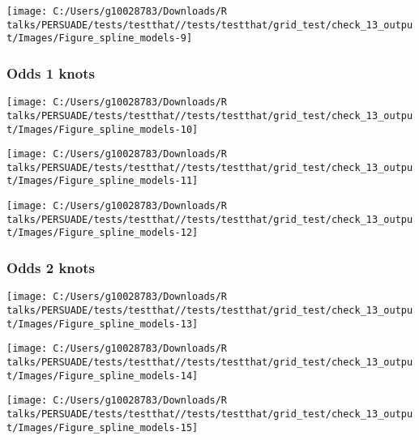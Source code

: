\documentclass[
]{article}
\begin{document}
\begin{flushleft}\texttt{[image: C:/Users/g10028783/Downloads/R talks/PERSUADE/tests/testthat//tests/testthat/grid\_test/check\_13\_output/Images/Figure\_spline\_models-9]} \end{flushleft}

\clearpage

\subsubsection{Odds 1 knots}\label{odds-1-knots}

\begin{flushleft}\texttt{[image: C:/Users/g10028783/Downloads/R talks/PERSUADE/tests/testthat//tests/testthat/grid\_test/check\_13\_output/Images/Figure\_spline\_models-10]} \end{flushleft}

\begin{flushleft}\texttt{[image: C:/Users/g10028783/Downloads/R talks/PERSUADE/tests/testthat//tests/testthat/grid\_test/check\_13\_output/Images/Figure\_spline\_models-11]} \end{flushleft}

\begin{flushleft}\texttt{[image: C:/Users/g10028783/Downloads/R talks/PERSUADE/tests/testthat//tests/testthat/grid\_test/check\_13\_output/Images/Figure\_spline\_models-12]} \end{flushleft}

\clearpage

\subsubsection{Odds 2 knots}\label{odds-2-knots}

\begin{flushleft}\texttt{[image: C:/Users/g10028783/Downloads/R talks/PERSUADE/tests/testthat//tests/testthat/grid\_test/check\_13\_output/Images/Figure\_spline\_models-13]} \end{flushleft}

\begin{flushleft}\texttt{[image: C:/Users/g10028783/Downloads/R talks/PERSUADE/tests/testthat//tests/testthat/grid\_test/check\_13\_output/Images/Figure\_spline\_models-14]} \end{flushleft}

\begin{flushleft}\texttt{[image: C:/Users/g10028783/Downloads/R talks/PERSUADE/tests/testthat//tests/testthat/grid\_test/check\_13\_output/Images/Figure\_spline\_models-15]} \end{flushleft}
\end{document}
